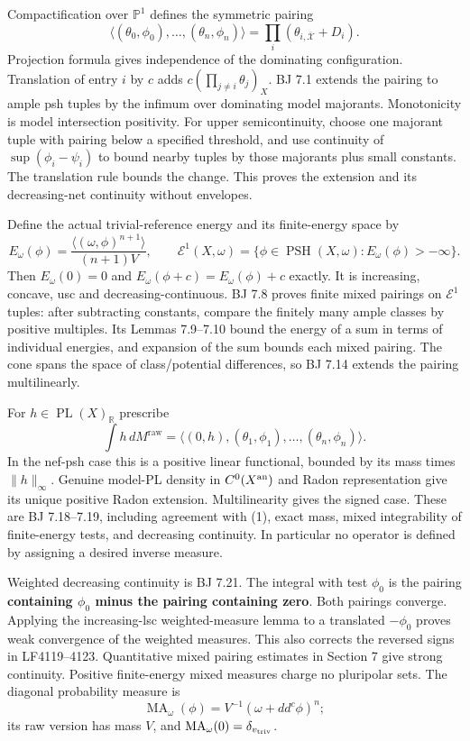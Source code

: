 \documentclass[
  11pt,
]{article}
\providecommand{\PSH}{\operatorname{PSH}}
\providecommand{\MA}{\operatorname{MA}}
\begin{document}
Compactification over \(\mathbb P^1\) defines the symmetric pairing \[
 \langle(\theta_0,\phi_0),\ldots,(\theta_n,\phi_n)\rangle
       =\prod_i(\theta_{i,\overline{\mathcal X}}+D_i).
\] Projection formula gives independence of the dominating
configuration. Translation of entry \(i\) by \(c\) adds
\(c(\prod_{j\ne i}\theta_j)_X\). BJ 7.1 extends the pairing to ample psh
tuples by the infimum over dominating model majorants. Monotonicity is
model intersection positivity. For upper semicontinuity, choose one
majorant tuple with pairing below a specified threshold, and use
continuity of \(\sup(\phi_i-\psi_i)\) to bound nearby tuples by those
majorants plus small constants. The translation rule bounds the change.
This proves the extension and its decreasing-net continuity without
envelopes.

Define the actual trivial-reference energy and its finite-energy space
by \[
 E_\omega(\phi)=\frac{\langle(\omega,\phi)^{n+1}\rangle}{(n+1)V},\qquad
 \mathcal E^1(X,\omega)=\{\phi\in\PSH(X,\omega):E_\omega(\phi)>-\infty\}.
                                                               \tag{2}
\] Then \(E_\omega(0)=0\) and \(E_\omega(\phi+c)=E_\omega(\phi)+c\)
exactly. It is increasing, concave, usc and decreasing-continuous. BJ
7.8 proves finite mixed pairings on \(\mathcal E^1\) tuples: after
subtracting constants, compare the finitely many ample classes by
positive multiples. Its Lemmas 7.9--7.10 bound the energy of a sum in
terms of individual energies, and expansion of the sum bounds each mixed
pairing. The cone spans the space of class/potential differences, so BJ
7.14 extends the pairing multilinearly.

For \(h\in\operatorname{PL}(X)_{\mathbb R}\) prescribe \[
 \int h\,dM^{\mathrm{raw}}=
 \langle(0,h),(\theta_1,\phi_1),\ldots,(\theta_n,\phi_n)\rangle.          \tag{3}
\] In the nef-psh case this is a positive linear functional, bounded by
its mass times \(\|h\|_\infty\). Genuine model-PL density in
\(C^0(X^{\rm an})\) and Radon representation give its unique positive
Radon extension. Multilinearity gives the signed case. These are BJ
7.18--7.19, including agreement with (1), exact mass, mixed
integrability of finite-energy tests, and decreasing continuity. In
particular no operator is defined by assigning a desired inverse
measure.

Weighted decreasing continuity is BJ 7.21. The integral with test
\(\phi_0\) is the pairing \textbf{containing \(\phi_0\) minus the
pairing containing zero}. Both pairings converge. Applying the
increasing-lsc weighted-measure lemma to a translated \(-\phi_0\) proves
weak convergence of the weighted measures. This also corrects the
reversed signs in LF4119--4123. Quantitative mixed pairing estimates in
Section 7 give strong continuity. Positive finite-energy mixed measures
charge no pluripolar sets. The diagonal probability measure is
\[\MA_\omega(\phi)=V^{-1}(\omega+dd^c\phi)^n;\] its raw version has mass
\(V\), and \(\MA_\omega(0)=\delta_{v_{\rm triv}}\).
\end{document}
